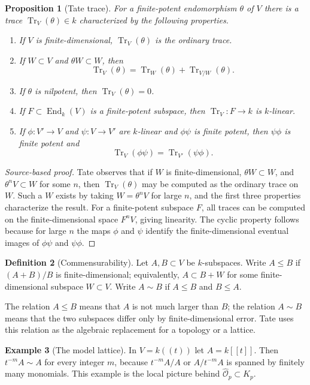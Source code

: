 \documentclass[11pt,a4paper]{article}
\newcommand{\wideO}{\widehat{\mathcal O}}
\newcommand{\End}{\operatorname{End}}
\newcommand{\Tr}{\operatorname{Tr}}
\theoremstyle{definition}
\newtheorem{definition}{Definition}[section]
\newtheorem{example}[definition]{Example}
\theoremstyle{plain}
\newtheorem{proposition}[definition]{Proposition}
\theoremstyle{remark}
\begin{document}
\begin{proposition}[Tate trace]
For a finite-potent endomorphism $\theta$ of $V$ there is a trace $\Tr_V(\theta)\in k$ characterized by the following properties.
\begin{enumerate}[label=(T\arabic*)]
\item If $V$ is finite-dimensional, $\Tr_V(\theta)$ is the ordinary trace.
\item If $W\subset V$ and $\theta W\subset W$, then
\[
  \Tr_V(\theta)=\Tr_W(\theta)+\Tr_{V/W}(\theta).
\]
\item If $\theta$ is nilpotent, then $\Tr_V(\theta)=0$.
\item If $F\subset\End_k(V)$ is a finite-potent subspace, then $\Tr_V\colon F\to k$ is $k$-linear.
\item If $\phi\colon V'\to V$ and $\psi\colon V\to V'$ are $k$-linear and $\phi\psi$ is finite potent, then $\psi\phi$ is finite potent and
\[
  \Tr_V(\phi\psi)=\Tr_{V'}(\psi\phi).
\]
\end{enumerate}
\end{proposition}

\begin{proof}[Source-based proof]
Tate observes that if $W$ is finite-dimensional, $\theta W\subset W$, and $\theta^nV\subset W$ for some $n$, then $\Tr_V(\theta)$ may be computed as the ordinary trace on $W$.  Such a $W$ exists by taking $W=\theta^nV$ for large $n$, and the first three properties characterize the result.  For a finite-potent subspace $F$, all traces can be computed on the finite-dimensional space $F^nV$, giving linearity.  The cyclic property follows because for large $n$ the maps $\phi$ and $\psi$ identify the finite-dimensional eventual images of $\phi\psi$ and $\psi\phi$.
\end{proof}

\begin{definition}[Commensurability]
Let $A,B\subset V$ be $k$-subspaces.  Write $A\le B$ if $(A+B)/B$ is finite-dimensional; equivalently, $A\subset B+W$ for some finite-dimensional subspace $W\subset V$.  Write $A\sim B$ if $A\le B$ and $B\le A$.
\end{definition}

The relation $A\le B$ means that $A$ is not much larger than $B$; the relation $A\sim B$ means that the two subspaces differ only by finite-dimensional error.  Tate uses this relation as the algebraic replacement for a topology or a lattice.

\begin{example}[The model lattice]
In $V=k((t))$ let $A=k[[t]]$.  Then $t^{-m}A\sim A$ for every integer $m$, because $t^{-m}A/A$ or $A/t^{-m}A$ is spanned by finitely many monomials.  This example is the local picture behind $\wideO_p\subset K_p$.
\end{example}
\end{document}
